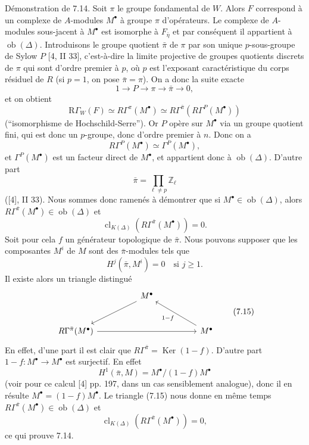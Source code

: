 \documentclass[11pt]{article}
\providecommand{\Ker}{\operatorname{Ker}}
\providecommand{\Ob}{\operatorname{ob}}
\providecommand{\Ker}{\operatorname{Ker}}
\providecommand{\Ker}{\operatorname{Ker}}
\providecommand{\Ob}{\operatorname{ob}}
\providecommand{\Ob}{\operatorname{Ob}}
\providecommand{\clK}[1]{\operatorname{cl}_{K(#1)}}
\providecommand{\RG}{\mathrm R\Gamma}
\providecommand{\Ob}{\operatorname{ob}}
\providecommand{\Ob}{\operatorname{Ob}}
\begin{document}
Démonstration de 7.14. Soit $\pi$ le groupe fondamental de $W$. Alors $F$ correspond à un complexe de $A$-modules $M^\bullet$ à groupe $\pi$ d'opérateurs. Le complexe de $A$-modules sous-jacent à $M^\bullet$ est isomorphe à $F_{\bar\eta}$ et par conséquent il appartient à $\Ob(\Delta)$. Introduisons le groupe quotient $\bar\pi$ de $\pi$ par son unique $p$-sous-groupe de Sylow $P$ [4, II 33], c'est-à-dire la limite projective de groupes quotients discrets de $\pi$ qui sont d'ordre premier à $p$, où $p$ est l'exposant caractéristique du corps résiduel de $R$ (si $p=1$, on pose $\bar\pi=\pi$). On a donc la suite exacte
\[
1\longrightarrow P\longrightarrow \pi\longrightarrow \bar\pi\longrightarrow0,
\]
et on obtient
\[
\RG_W(F)\simeq R\Gamma^\pi(M^\bullet)
\simeq R\Gamma^{\bar\pi}(R\Gamma^P(M^\bullet))
\]
(``isomorphisme de Hochschild-Serre''). Or $P$ opère sur $M^\bullet$ via un groupe quotient fini, qui est donc un $p$-groupe, donc d'ordre premier à $n$. Donc on a
\[
R\Gamma^P(M^\bullet)\simeq \Gamma^P(M^\bullet),
\]
et $\Gamma^P(M^\bullet)$ est un facteur direct de $M^\bullet$, et appartient donc à $\Ob(\Delta)$. D'autre part
\[
\bar\pi=\prod_{\ell\ne p}\mathbb Z_\ell
\]
([4], II 33). Nous sommes donc ramenés à démontrer que si $M^\bullet\in\Ob(\Delta)$, alors $R\Gamma^{\bar\pi}(M^\bullet)\in\Ob(\Delta)$ et
\[
\clK{\Delta}(R\Gamma^{\bar\pi}(M^\bullet))=0.
\]
Soit pour cela $f$ un générateur topologique de $\bar\pi$. Nous pouvons supposer que les composantes $M^i$ de $M$ sont des $\bar\pi$-modules tels que
\[
H^j(\bar\pi,M^i)=0\quad\text{si }j\ge1.
\]
Il existe alors un triangle distingué
\[
\begin{tikzcd}[column sep=huge,row sep=large]
& M^\bullet \arrow[dl] &\\
R\Gamma^{\bar\pi}(M^\bullet) \arrow[rr] && M^\bullet \arrow[ul,"1-f"]
\end{tikzcd}
\tag{7.15}
\]
En effet, d'une part il est clair que $R\Gamma^{\bar\pi}=\Ker(1-f)$. D'autre part $1-f:M^\bullet\to M^\bullet$ est surjectif. En effet
\[
H^1(\bar\pi,M)=M^\bullet/(1-f)M^\bullet
\]
(voir pour ce calcul [4] pp. 197, dans un cas sensiblement analogue), donc il en résulte $M^\bullet=(1-f)M^\bullet$. Le triangle (7.15) nous donne en même temps $R\Gamma^{\bar\pi}(M^\bullet)\in\Ob(\Delta)$ et
\[
\clK{\Delta}(R\Gamma^{\bar\pi}(M^\bullet))=0,
\]
ce qui prouve 7.14.
\end{document}
